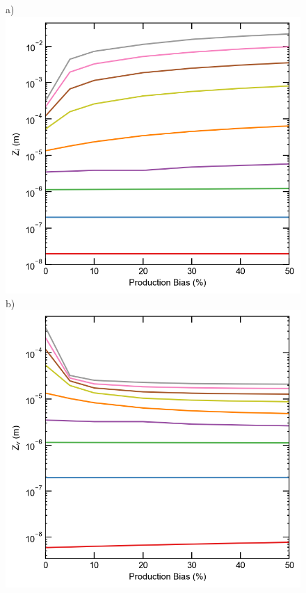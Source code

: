 \documentclass[utf8]{frontiersSCNS} %
\begin{document}
    \begin{figure}[h!]  %
        \centering
        a)\includegraphics[scale=0.55]{sink_strength_neutron_Zi_scaled_nolegend}
        b)\includegraphics[scale=0.55]{sink_strength_neutron_Zv_scaled_nolegend}

\end{figure}
\end{document}
